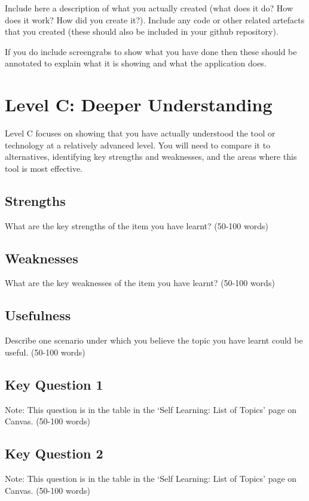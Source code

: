 \documentclass[a4paper, 11pt]{report}
\begin{document}
Include here a description of what you actually created (what does it do? How does it work? How did you create it?). Include any code or other related artefacts that you created (these should also be included in your github repository).

If you do include screengrabs to show what you have done then these should be annotated to explain what it is showing and what the application does.



\newpage
\section{Level C: Deeper Understanding}

Level C focuses on showing that you have actually understood the tool or technology at a relatively advanced level. You will need to compare it to alternatives, identifying key strengths and weaknesses, and the areas where this tool is most effective. 

\subsection{Strengths}
What are the key strengths of the item you have learnt? (50-100 words)

\subsection{Weaknesses}
What are the key weaknesses of the item you have learnt? (50-100 words)

\subsection{Usefulness}
Describe one scenario under which you believe the topic you have learnt could be useful. (50-100 words)

\subsection{Key Question 1}
Note: This question is in the table in the ‘Self Learning: List of Topics’ page on Canvas. (50-100 words)

\subsection{Key Question 2}
Note: This question is in the table in the ‘Self Learning: List of Topics’ page on Canvas. (50-100 words)
\end{document}
